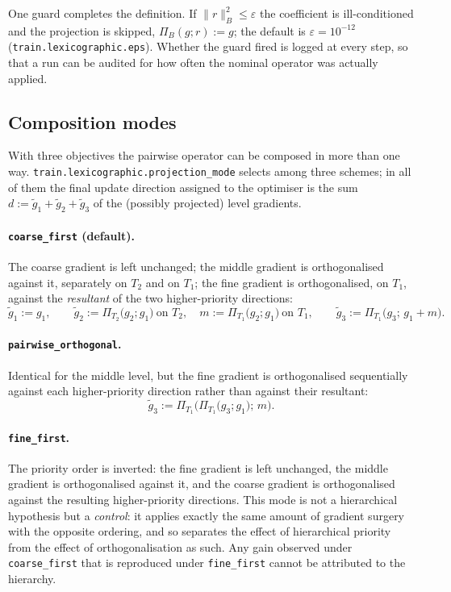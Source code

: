 One guard completes the definition. If $\lVert r\rVert_B^2 \le \varepsilon$ the coefficient is
ill-conditioned and the projection is skipped, $\Pi_B(g;r) := g$; the default is
$\varepsilon = 10^{-12}$ (\texttt{train.lexicographic.eps}). Whether the guard fired is logged at
every step, so that a run can be audited for how often the nominal operator was actually applied.

\subsection{Composition modes}
\label{ssec:lex_modes}

With three objectives the pairwise operator can be composed in more than one way.
\texttt{train.lexicographic.projection\_mode} selects among three schemes; in all of them the
final update direction assigned to the optimiser is the sum
$d := \tilde g_1 + \tilde g_2 + \tilde g_3$ of the (possibly projected) level gradients.

\paragraph{\texttt{coarse\_first} (default).} The coarse gradient is left unchanged; the middle
gradient is orthogonalised against it, separately on $T_2$ and on $T_1$; the fine gradient is
orthogonalised, on $T_1$, against the \emph{resultant} of the two higher-priority directions:
\[
\tilde g_1 := g_1,\qquad
\tilde g_2 := \Pi_{T_2}\!\big(g_2;g_1\big)\ \text{on }T_2,\quad
m := \Pi_{T_1}\!\big(g_2;g_1\big)\ \text{on }T_1,\qquad
\tilde g_3 := \Pi_{T_1}\!\big(g_3;\,g_1+m\big).
\]

\paragraph{\texttt{pairwise\_orthogonal}.} Identical for the middle level, but the fine gradient
is orthogonalised sequentially against each higher-priority direction rather than against their
resultant:
\[
\tilde g_3 := \Pi_{T_1}\!\Big(\Pi_{T_1}\big(g_3;g_1\big);\, m\Big).
\]

\paragraph{\texttt{fine\_first}.} The priority order is inverted: the fine gradient is left
unchanged, the middle gradient is orthogonalised against it, and the coarse gradient is
orthogonalised against the resulting higher-priority directions. This mode is not a hierarchical
hypothesis but a \emph{control}: it applies exactly the same amount of gradient surgery with the
opposite ordering, and so separates the effect of hierarchical priority from the effect of
orthogonalisation as such. Any gain observed under \texttt{coarse\_first} that is reproduced
under \texttt{fine\_first} cannot be attributed to the hierarchy.

